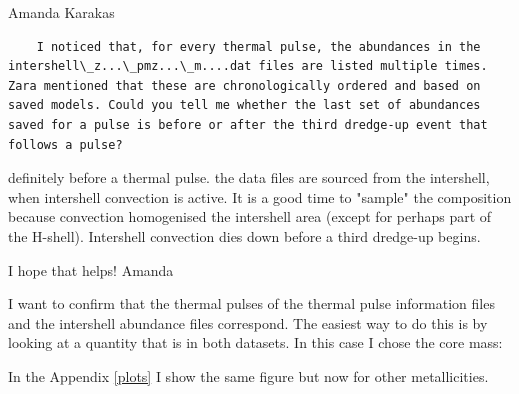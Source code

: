 \documentclass[a4paper,10pt]{article}
\begin{document}
\begin{minipage}{1.45\textwidth}
\begin{shadequote}{Amanda Karakas}
\begin{verbatim}
    I noticed that, for every thermal pulse, the abundances in the intershell\_z...\_pmz...\_m....dat files are listed multiple times. Zara mentioned that these are chronologically ordered and based on saved models. Could you tell me whether the last set of abundances saved for a pulse is before or after the third dredge-up event that follows a pulse?
\end{verbatim}

definitely before a thermal pulse.  the data files are sourced from the intershell, when intershell convection is active. It is a good time to "sample" the composition because convection homogenised the intershell area (except for perhaps part of the H-shell). Intershell convection dies down before a third dredge-up begins.

I hope that helps!
Amanda

\end{shadequote}
\end{minipage}



I want to confirm that the thermal pulses of the thermal pulse information files and the intershell abundance files correspond.
The easiest way to do this is by looking at a quantity that is in both datasets. In this case I chose the core mass:
\begin{figure}[ht]
    \centering
\end{figure}

\begin{figure}[ht]
    \centering
\end{figure}

In the Appendix \ref{plots} I show the same figure but now for other metallicities.
\end{document}
